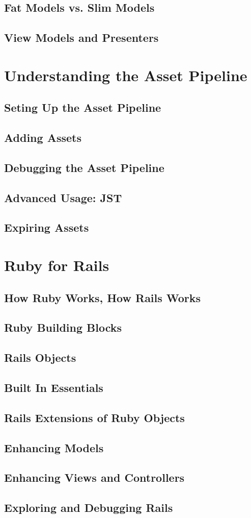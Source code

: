 \documentclass[a4paper]{article}
\begin{document}
\subsection{Fat Models vs. Slim Models}
\subsection{View Models and Presenters}
\newpage
\section{Understanding the Asset Pipeline}
\subsection{Seting Up the Asset Pipeline}
\subsection{Adding Assets}
\subsection{Debugging the Asset Pipeline}
\subsection{Advanced Usage: JST}
\subsection{Expiring Assets}
\newpage
\section{Ruby for Rails}
\subsection{How Ruby Works, How Rails Works}
\subsection{Ruby Building Blocks}
\subsection{Rails Objects}
\subsection{Built In Essentials}
\subsection{Rails Extensions of Ruby Objects}
\subsection{Enhancing Models}
\subsection{Enhancing Views and Controllers}
\subsection{Exploring and Debugging Rails}
\end{document}
